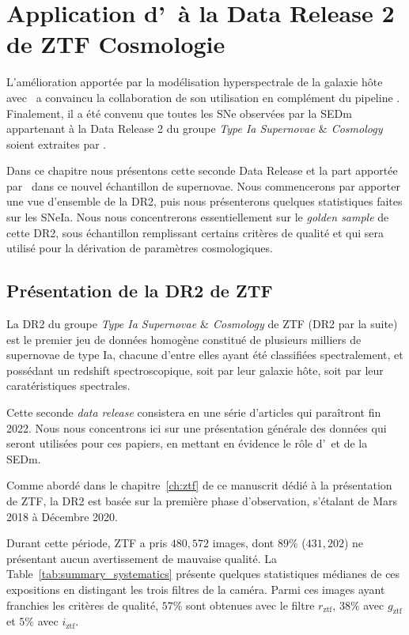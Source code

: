 \documentclass[../main/main.tex]{subfiles}
\begin{document}
\setcounter{chapter}{9}
\chapter{Application d'\hypergal\ à la Data Release 2 de ZTF Cosmologie}\label{ch:dr2}

\minitoc
\vspace{2cm}
L'amélioration apportée par la modélisation hyperspectrale de la galaxie
hôte avec \hypergal\ a convaincu la collaboration de son utilisation en
complément du pipeline \pysedm. Finalement, il a été convenu que toutes les SNe
observées par la SEDm appartenant à la Data Release 2 du groupe \textit{Type Ia Supernovae $\&$ Cosmology}
soient extraites par \hypergal.

Dans ce chapitre nous présentons cette seconde Data Release et la part apportée par \hypergal\ dans ce nouvel
échantillon de supernovae. Nous commencerons par apporter une vue
d'ensemble de la DR2, puis nous présenterons quelques statistiques
faites sur les SNeIa. Nous nous concentrerons essentiellement sur le
\textit{golden sample} de cette DR2,
sous échantillon remplissant certains critères de qualité et qui sera
utilisé pour la dérivation de paramètres cosmologiques.
\newpage

\section{Présentation de la DR2 de ZTF}

La DR2 du groupe \textit{Type Ia Supernovae $\&$ Cosmology} de ZTF (DR2
par la suite) est le premier jeu de données homogène constitué de plusieurs
milliers de supernovae de type Ia, chacune d'entre elles ayant été
classifiées spectralement, et possédant un redshift spectroscopique,
soit par leur galaxie hôte, soit par leur caratéristiques spectrales.

Cette seconde \textit{data release} consistera en une série d'articles qui
paraîtront fin 2022. Nous nous concentrons ici sur une présentation
générale des données qui seront utilisées pour ces papiers, en mettant
en évidence le rôle d'\hypergal\ et de la SEDm.

Comme abordé dans le chapitre~\ref{ch:ztf} de ce manuscrit dédié à la
présentation de ZTF, la DR2 est basée sur la première phase
d'observation, s'étalant de Mars 2018 à Décembre 2020.

Durant cette période, ZTF a pris $480,572$
images, dont $89\%$ ($431,202$) ne présentant aucun avertissement de
mauvaise qualité. La Table~\ref{tab:summary_systematics} présente quelques statistiques
médianes de ces expositions en distingant les trois filtres de la
caméra. Parmi ces images ayant franchies les critères de qualité, $57\%$ sont obtenues avec 
le filtre $r_{\text{ztf}}$, $38\%$ avec $g_{\text{ztf}}$ et $5\%$ avec $i_{\text{ztf}}$.
\end{document}
